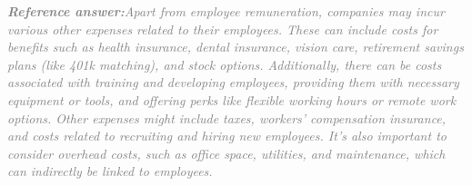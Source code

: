 \documentclass[a4paper,11pt]{article}
\begin{document}
\begin{refanswerenv}
{\footnotesize\textit{\textcolor{gray}{\textbf{Reference answer:}\enspace Apart from employee remuneration, companies may incur various other expenses related to their employees. These can include costs for benefits such as health insurance, dental insurance, vision care, retirement savings plans (like 401k matching), and stock options. Additionally, there can be costs associated with training and developing employees, providing them with necessary equipment or tools, and offering perks like flexible working hours or remote work options. Other expenses might include taxes, workers' compensation insurance, and costs related to recruiting and hiring new employees. It's also important to consider overhead costs, such as office space, utilities, and maintenance, which can indirectly be linked to employees.}}}
\end{refanswerenv}
\end{document}
